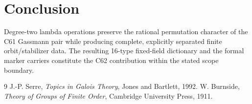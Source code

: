 \documentclass[11pt]{article}
\begin{document}
\section{Conclusion}
Degree-two lambda operations preserve the rational permutation character of
the C61 Gassmann pair while producing complete, explicitly separated finite
orbit/stabilizer data.  The resulting 16-type fixed-field dictionary and the
formal marker carriers constitute the C62 contribution within the stated
scope boundary.


\begin{thebibliography}{9}
J.-P. Serre, \emph{Topics in Galois Theory}, Jones and Bartlett, 1992.
W. Burnside, \emph{Theory of Groups of Finite Order}, Cambridge University Press, 1911.
\end{thebibliography}
\end{document}
